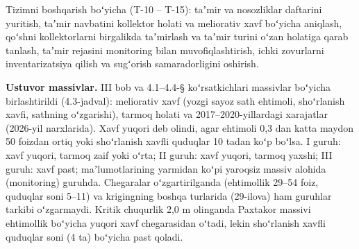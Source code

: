 Tizimni boshqarish boʻyicha (T-10 -- T-15): taʼmir va nosozliklar
daftarini yuritish, taʼmir navbatini kollektor holati va meliorativ xavf
boʻyicha aniqlash, qoʻshni kollektorlarni birgalikda taʼmirlash va
taʼmir turini oʻzan holatiga qarab tanlash, taʼmir rejasini monitoring
bilan muvofiqlashtirish, ichki zovurlarni inventarizatsiya qilish va
sugʻorish samaradorligini oshirish.

\textbf{Ustuvor massivlar.} III bob va 4.1--4.4-§ koʻrsatkichlari
massivlar boʻyicha birlashtirildi (4.3-jadval): meliorativ xavf (yozgi
sayoz sath ehtimoli, shoʻrlanish xavfi, sathning oʻzgarishi), tarmoq
holati va 2017--2020-yillardagi xarajatlar (2026-yil narxlarida). Xavf
yuqori deb olindi, agar ehtimoli 0,3 dan katta maydon 50 foizdan ortiq
yoki shoʻrlanish xavfli quduqlar 10 tadan koʻp boʻlsa. I guruh: xavf
yuqori, tarmoq zaif yoki oʻrta; II guruh: xavf yuqori, tarmoq yaxshi;
III guruh: xavf past; maʼlumotlarining yarmidan koʻpi yaroqsiz massiv
alohida (monitoring) guruhda. Chegaralar oʻzgartirilganda (ehtimollik
29--54 foiz, quduqlar soni 5--11) va krigingning boshqa turlarida
(29-ilova) ham guruhlar tarkibi oʻzgarmaydi. Kritik chuqurlik 2,0 m
olinganda Paxtakor massivi ehtimollik boʻyicha yuqori xavf chegarasidan
oʻtadi, lekin shoʻrlanish xavfli quduqlar soni (4 ta) boʻyicha past
qoladi.



